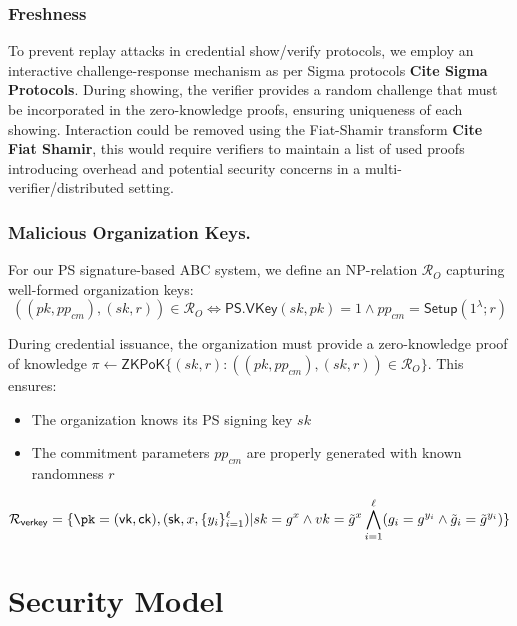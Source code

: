 \subsubsection{Freshness}
To prevent replay attacks in credential show/verify protocols, we employ an interactive challenge-response mechanism as per Sigma protocols \textbf{Cite Sigma Protocols}. During showing, the verifier provides a random challenge that must be incorporated in the zero-knowledge proofs, ensuring uniqueness of each showing. Interaction could be removed using the Fiat-Shamir transform \textbf{Cite Fiat Shamir}, this would require verifiers to maintain a list of used proofs introducing overhead and potential security concerns in a multi-verifier/distributed setting.

\subsubsection{Malicious Organization Keys.}
For our PS signature-based ABC system, we define an NP-relation $\mathcal{R}_O$ capturing well-formed organization keys:
$$ ((pk, pp_{cm}), (sk, r)) \in \mathcal{R}_O \iff \mathsf{PS.VKey}(sk, pk) = 1 \land pp_{cm} = \mathsf{Setup}(1^\lambda; r) $$

During credential issuance, the organization must provide a zero-knowledge proof of knowledge 
$\pi \gets \mathsf{ZKPoK}\{(sk,r): ((pk, pp_{cm}), (sk,r)) \in \mathcal{R}_O\}$. 
This ensures:
\begin{itemize}
    \item The organization knows its PS signing key $sk$
    \item The commitment parameters $pp_{cm}$ are properly generated with known randomness $r$
\end{itemize}



        \[
        \mathcal{R}_{\mathsf{verkey}} = \{\pk = (\vk, \ck),(\sk, x, \{y_i\}_{i=1}^\ell) | sk = g^x \wedge vk = \tilde{g}^x \bigwedge_{i=1}^\ell (g_i = g^{y_i} \wedge \tilde{g}_i = \tilde{g}^{y_i})\}
        \]











\newpage
\section{Security Model}

